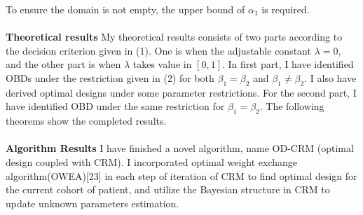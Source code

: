\documentclass[12pt]{article}
\begin{document}
 To ensure the domain is not empty, the upper bound of $\alpha_1$ is required.\\
 \\
 \textbf{Theoretical results}
 My theoretical results consists of two parts according to the decision criterion given in (1). One is when the adjustable constant $\lambda=0$, and the other part is when $\lambda$ takes value in $[0,1]$. In first part, I have identified OBDs under the restriction given in (2) for both $\beta_1=\beta_2$ and $\beta_1 \neq \beta_2$. I also have derived optimal designs under some parameter restrictions. For the second part, I have identified OBD under the same restriction for $\beta_1=\beta_2$.  The following theorems show the completed results.\\
 \\
\textbf{Algorithm Results}
I have finished a novel algorithm, name OD-CRM (optimal design coupled with CRM). I incorporated optimal weight exchange algorithm(OWEA)[23] in each step of iteration of CRM to find optimal design for the current cohort of patient, and utilize the Bayesian structure in CRM to update unknown parameters estimation. 
\end{document}

